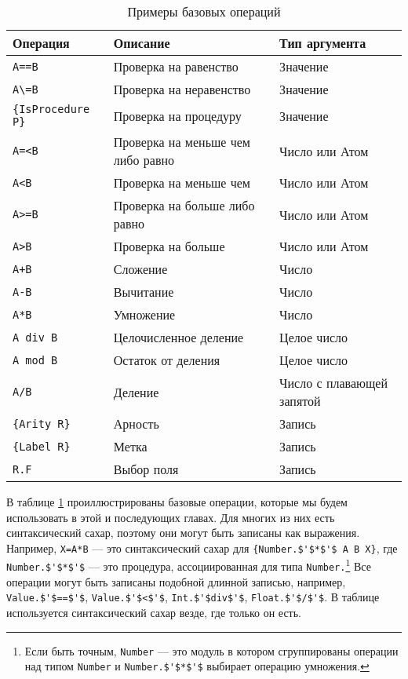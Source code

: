\begin{table}
  \begin{tabular}{|lll|}
    \hline
    Операция & Описание & Тип аргумента\\
    \hline
    \lstinline|A==B| & Проверка на равенство & Значение\\
    \lstinline|A\=B| & Проверка на неравенство & Значение\\
    \lstinline|{IsProcedure P}| & Проверка на процедуру & Значение\\
    \lstinline|A=<B| & Проверка на меньше чем либо равно & Число или Атом\\
    \lstinline|A<B| & Проверка на меньше чем & Число или Атом\\
    \lstinline|A>=B| & Проверка на больше либо равно & Число или Атом\\
    \lstinline|A>B| & Проверка на больше & Число или Атом\\
    \lstinline|A+B| & Сложение & Число\\
    \lstinline|A-B| & Вычитание & Число\\
    \lstinline|A*B| & Умножение & Число\\
    \lstinline|A div B| & Целочисленное деление & Целое число\\
    \lstinline|A mod B| & Остаток от деления & Целое число\\
    \lstinline|A/B| & Деление & Число с плавающей запятой\\
    \lstinline|{Arity R}| & Арность & Запись\\
    \lstinline|{Label R}| & Метка & Запись\\
    \lstinline|R.F| & Выбор поля & Запись\\
    \hline
  \end{tabular}
  
\caption{Примеры базовых операций}
\label{table:examples_of_basic_operations}
\end{table}

В таблице \ref{table:examples_of_basic_operations} проиллюстрированы базовые операции, которые мы будем использовать в этой и последующих главах. Для многих из них есть синтаксический сахар, поэтому они могут быть записаны как выражения. Например, \lstinline|X=A*B| --- это синтаксический сахар для  \lstinline|{Number.$'$*$'$ A B X}|, где  \lstinline|Number.$'$*$'$|  --- это процедура, ассоциированная для типа \lstinline|Number.|\footnote{Если быть точным, \lstinline|Number| --- это модуль в котором сгруппированы операции над типом \lstinline|Number| и \lstinline|Number.$'$*$'$| выбирает операцию умножения.} Все операции могут быть записаны подобной длинной записью, например,  \lstinline|Value.$'$==$'$|, \lstinline|Value.$'$<$'$|, \lstinline|Int.$'$div$'$|, \lstinline|Float.$'$/$'$|. В таблице используется синтаксический сахар везде, где только он есть.

